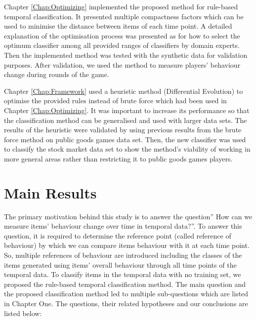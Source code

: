 Chapter \ref{Chap:Optimizing} implemented the proposed method for rule-based temporal classification. It presented multiple compactness factors which can be used to minimise the distance between items of each time point. A detailed explanation of the optimisation process was presented as for how to select the optimum classifier among all provided ranges of classifiers by domain experts. Then the implemented method was tested with the synthetic data for validation purposes. After validation, we used the method to measure players' behaviour change during rounds of the game.

Chapter \ref{Chap:Framework} used a heuristic method (Differential Evolution) to optimise the provided rules instead of brute force which had been used in Chapter \ref{Chap:Optimizing}. It was important to increase its performance so that the classification method can be generalised and used with larger data sets. The results of the heuristic were validated by using previous results from the brute force method on public goods games data set. Then, the new classifier was used to classify the stock market data set to show the method's viability of working in more general areas rather than restricting it to public goods games players. 

\section{Main Results}

The primary motivation behind this study is to answer the question'' How can we measure items' behaviour change over time in temporal data?''. To answer this question, it is required to determine the reference point (called reference of behaviour) by which we can compare items behaviour with it at each time point. So, multiple references of behaviour are introduced including the classes of the items generated using items' overall behaviour through all time points of the temporal data. To classify items in the temporal data with no training set, we proposed the rule-based temporal classification method. The main question and the proposed classification method led to multiple sub-questions which are listed in Chapter One. The questions, their related hypotheses and our conclusions are listed below:

